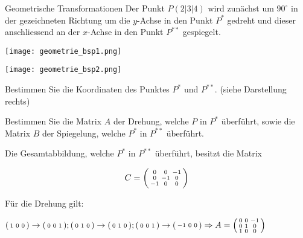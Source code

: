\begin{example2}{Geometrische Transformationen}
    Der Punkt $P(2|3| 4)$ wird zunächst um $90^{\circ}$ in der gezeichneten Richtung um die $y$-Achse in den Punkt $P^{*}$ gedreht und dieser anschliessend an der $x$-Achse in den Punkt $P^{* *}$ gespiegelt.
    
    \begin{minipage}{0.5\linewidth}
        \texttt{[image: geometrie\_bsp1.png]}
    \end{minipage}
    \begin{minipage}{0.5\linewidth}
        \texttt{[image: geometrie\_bsp2.png]}
    \end{minipage}

    Bestimmen Sie die Koordinaten des Punktes $P^{*}$ und $P^{* *}$. (siehe Darstellung rechts)

    \vspace{3mm}

    Bestimmen Sie die Matrix $A$ der Drehung, welche $P$ in $P^{*}$ überführt, sowie die Matrix $B$ der Spiegelung, welche $P^{*}$ in $P^{* *}$ überführt.
    
    Die Gesamtabbildung, welche $P^{*}$ in $P^{* *}$ überführt, besitzt die Matrix

    $$
    C=\begin{psmallmatrix}
        0 & 0 & -1 \\
        0 & -1 & 0 \\
        -1 & 0 & 0
    \end{psmallmatrix}
    $$

    Für die Drehung gilt:

    $
    \begin{psmallmatrix}
        1 & 0 & 0
    \end{psmallmatrix} \rightarrow \begin{psmallmatrix}
        0 & 0 & 1
    \end{psmallmatrix} ; \begin{psmallmatrix}
        0 & 1 & 0
    \end{psmallmatrix} \rightarrow \begin{psmallmatrix}
        0 & 1 & 0
    \end{psmallmatrix} ; \begin{psmallmatrix}
        0 & 0 & 1
    \end{psmallmatrix} \rightarrow \begin{psmallmatrix}
        -1 & 0 & 0
    \end{psmallmatrix} \\ \Rightarrow A=\begin{psmallmatrix}
        0 & 0 & -1 \\
        0 & 1 & 0 \\
        1 & 0 & 0
    \end{psmallmatrix}
    $


\end{example2}
